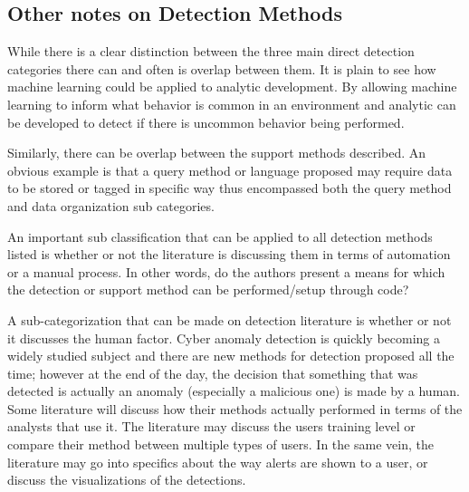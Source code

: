 \subsection{Other notes on Detection Methods}
While there is a clear distinction between the three main direct detection categories there can and often is overlap between them. 
It is plain to see how machine learning could be applied to analytic development. 
By allowing machine learning to inform what behavior is common in an environment and analytic can be developed to detect if there is uncommon behavior being performed.

Similarly, there can be overlap between the support methods described. 
An obvious example is that a query method or language proposed may require data to be stored or tagged in specific way thus encompassed both the query method and data organization sub categories.

An important sub classification that can be applied to all detection methods listed is whether or not the literature is discussing them in terms of automation or a manual process. 
In other words, do the authors present a means for which the detection or support method can be performed/setup through code?

A sub-categorization that can be made on detection literature is whether or not it discusses the human factor. 
Cyber anomaly detection is quickly becoming a widely studied subject and there are new methods for detection proposed all the time; however at the end of the day, the decision that something that was detected is actually an anomaly (especially a malicious one) is made by a human. 
Some literature will discuss how their methods actually performed in terms of the analysts that use it. 
The literature may discuss the users training level or compare their method between multiple types of users. 
In the same vein, the literature may go into specifics about the way alerts are shown to a user, or discuss the visualizations of the detections.


